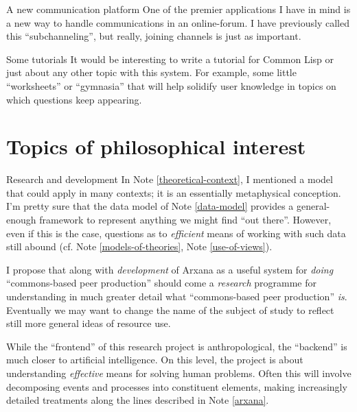 \begin{notate}{A new communication platform}
One of the premier applications I have in mind is a new
way to handle communications in an online-forum.  I have
previously called this ``subchanneling'', but really,
joining channels is just as important.
\end{notate}

\begin{notate}{Some tutorials}
It would be interesting to write a tutorial for Common
Lisp or just about any other topic with this system.  For
example, some little ``worksheets'' or ``gymnasia'' that
will help solidify user knowledge in topics on which
questions keep appearing.
\end{notate}

\section{Topics of philosophical interest}

\begin{notate}{Research and development}
In Note \ref{theoretical-context}, I mentioned a model
that could apply in many contexts; it is an essentially
metaphysical conception.  I'm pretty sure that the data
model of Note \ref{data-model} provides a general-enough
framework to represent anything we might find ``out
there''.  However, even if this is the case, questions as
to \emph{efficient} means of working with such data still
abound (cf. Note \ref{models-of-theories}, Note
\ref{use-of-views}).

I propose that along with \emph{development} of Arxana as
a useful system for \emph{doing} ``commons-based peer
production'' should come a \emph{research} programme for
understanding in much greater detail what ``commons-based
peer production'' \emph{is}.  Eventually we may want to
change the name of the subject of study to reflect still
more general ideas of resource use.

While the ``frontend'' of this research project is
anthropological, the ``backend'' is much closer to
artificial intelligence.  On this level, the project is
about understanding \emph{effective} means for solving
human problems.  Often this will involve decomposing
events and processes into constituent elements, making
increasingly detailed treatments along the lines described
in Note \ref{arxana}.
\end{notate}

